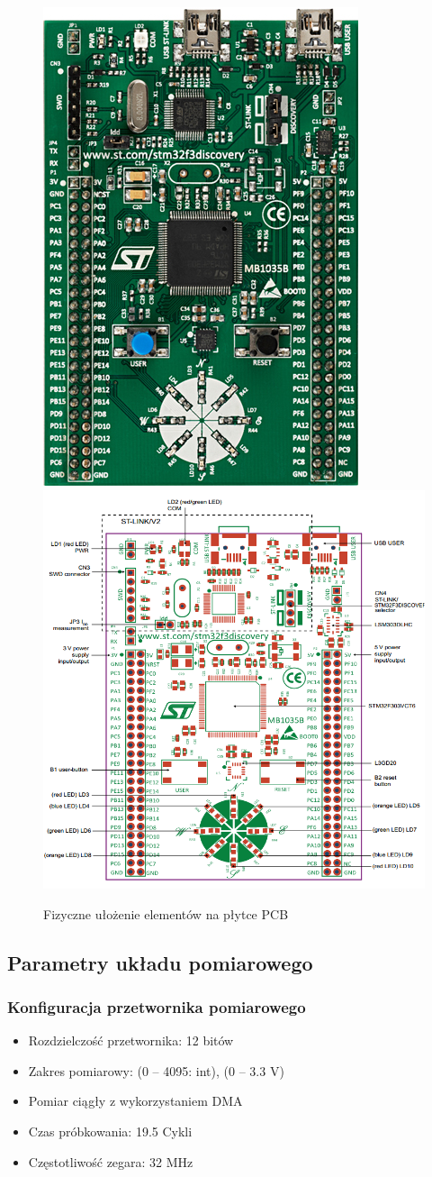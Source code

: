\documentclass[12pt,a4paper]{article}
\begin{document}
\begin{figure}[!htb]
\centering
\subfloat
{
\includegraphics[height=0.6\textwidth]{32f3discovery.jpg}
}
\subfloat
{
\includegraphics[height=0.6\textwidth]{stm32f3layout.png}
}
\caption{Fizyczne ułożenie elementów na płytce PCB\label{fig:layout}}
\end{figure}

\newpage
\subsection{Parametry układu pomiarowego}
\subsubsection{Konfiguracja przetwornika pomiarowego}
\begin{itemize}
\item Rozdzielczość przetwornika: 12 bitów
\item Zakres pomiarowy: (0 -- 4095: int), (0 -- 3.3 V)
\item Pomiar ciągły z wykorzystaniem DMA
\item Czas próbkowania: 19.5 Cykli
\item Częstotliwość zegara: 32 MHz
\end{itemize}
\end{document}
